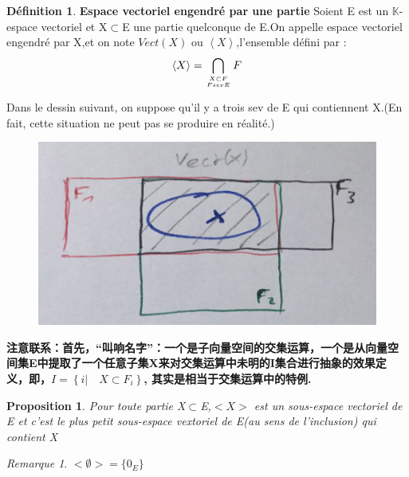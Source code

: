 \documentclass[12pt]{book}
\theoremstyle{definition}\newtheorem{dfn}{Définition}[chapter]
\theoremstyle{plain}\newtheorem{thm}{Théorème}[chapter]
\theoremstyle{plain}\newtheorem{prp}{Proposition}[chapter]
\theoremstyle{plain}\newtheorem{lem}{\bf Lemme}[chapter]
\theoremstyle{plain}\newtheorem{axm}{\bf Axiome}[chapter]
\theoremstyle{plain}\newtheorem{lmm}{\bf Lemme}[chapter]
\theoremstyle{plain}\newtheorem{cor}{\bf Corollaire}[chapter]
\theoremstyle{remark}\newtheorem{rem}{Remarque}[chapter]
\begin{document}
\begin{dfn}{\bf Espace vectoriel engendré par une partie}
Soient E est un $\mathbb{K}$-espace vectoriel et X$\subset$E une partie {\color{red} quelconque} de E.On appelle espace vectoriel
engendré par X,et on note $\mathit{Vect}(X)$
ou $\left \langle X \right \rangle$,l'ensemble défini par :
 \begin{align*}
 \left \langle X \right \rangle = \bigcap_{X\subset F   \atop F sev E}F
 \end{align*}
\end{dfn}

Dans le dessin suivant, on suppose qu'il y a trois sev de E qui contiennent X.(En fait, cette situation ne peut pas se produire en réalité.)
 \begin{figure}[H]
        \centering
        \includegraphics[width=1\textwidth]{image//Operation sur les espaces vectoriels//1}
        \end{figure}

\textbf{注意联系：首先，“叫响名字”：一个是子向量空间的交集运算，一个是从向量空间集E中提取了一个任意子集X来对交集运算中未明的I集合进行抽象的效果定义，即，$I=\left \{i|\quad  X \subset F_i\right \}$, 其实是相当于交集运算中的特例.}

\begin{prp}
        Pour toute partie X$\subset$E,$<X>$ est un sous-espace vectoriel de E et c'est le plus petit sous-espace vextoriel de E(au sens de l'inclusion) qui contient X
\end{prp}
\begin{rem}
        $<\emptyset>=\{0_E\}$
\end{rem}
\end{document}
